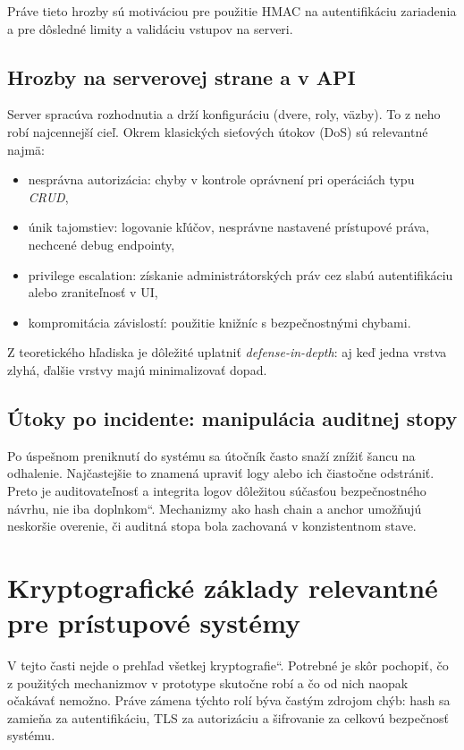 \documentclass[journal,a4paper,onecolumn]{IEEEtran}
\newcommand{\uv}[1]{\quotedblbase#1\textquotedblleft}
\begin{document}
Práve tieto hrozby sú motiváciou pre použitie HMAC na autentifikáciu zariadenia a pre dôsledné limity a validáciu vstupov na serveri.

\subsection{Hrozby na serverovej strane a v API}

Server spracúva rozhodnutia a drží konfiguráciu (dvere, roly, väzby). To z neho robí najcennejší cieľ. Okrem klasických sieťových útokov (DoS) sú relevantné najmä:

\begin{itemize}[leftmargin=*,itemsep=2pt]
  \item nesprávna autorizácia: chyby v kontrole oprávnení pri operáciách typu \emph{CRUD},
  \item únik tajomstiev: logovanie kľúčov, nesprávne nastavené prístupové práva, nechcené debug endpointy,
  \item privilege escalation: získanie administrátorských práv cez slabú autentifikáciu alebo zraniteľnosť v UI,
  \item kompromitácia závislostí: použitie knižníc s bezpečnostnými chybami.
\end{itemize}

Z teoretického hľadiska je dôležité uplatniť \emph{defense-in-depth}: aj keď jedna vrstva zlyhá, ďalšie vrstvy majú minimalizovať dopad.

\subsection{Útoky po incidente: manipulácia auditnej stopy}

Po úspešnom preniknutí do systému sa útočník často snaží znížiť šancu na odhalenie. Najčastejšie to znamená upraviť logy alebo ich čiastočne odstrániť. Preto je auditovateľnosť a integrita logov dôležitou súčasťou bezpečnostného návrhu, nie iba \uv{doplnkom}. Mechanizmy ako hash chain a anchor umožňujú neskoršie overenie, či auditná stopa bola zachovaná v konzistentnom stave.

\section{Kryptografické základy relevantné pre prístupové systémy}

V tejto časti nejde o \uv{prehľad všetkej kryptografie}. Potrebné je skôr pochopiť, čo z použitých mechanizmov v prototype skutočne robí a čo od nich naopak očakávať nemožno. Práve zámena týchto rolí býva častým zdrojom chýb: hash sa zamieňa za autentifikáciu, TLS za autorizáciu a šifrovanie za celkovú bezpečnosť systému.
\end{document}
